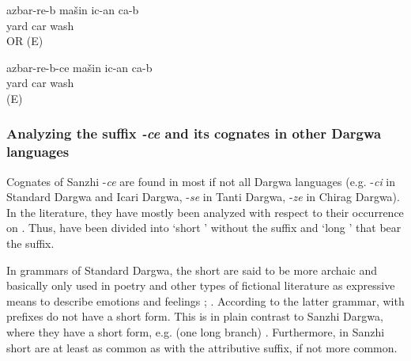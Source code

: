 \begin{exe}
	\ex	\label{ex:‎‎The car has to be washed in the yard minor}
	\gll	azbar-re-b	mašin	ic-an	ca-b\\
		yard	car	wash	\\
	\glt	{} OR  (E)

	\ex	\label{ex:‎‎‎The car that is in the yard has to be washed minor}
	\gll	azbar-re-b-ce	mašin	ic-an	ca-b\\
		yard	car	wash	\\
	\glt	{} (E)
\end{exe}


\subsubsection{Analyzing the suffix \textit{-ce} and its cognates in other Dargwa languages}
\label{sssec:Analyzing the suffix -ce and its cognates in other Dargwa languages}

Cognates of Sanzhi -\textit{ce} are found in most if not all Dargwa languages (e.g. -\textit{ci} in Standard Dargwa and Icari Dargwa, -\textit{se} in Tanti Dargwa, -\textit{ze} in Chirag Dargwa). In the literature, they have mostly been analyzed with respect to their occurrence on . Thus,  have been divided into `short ' without the suffix and `long ' that bear the suffix.

In grammars of Standard Dargwa, the short  are said to be more archaic and basically only used in poetry and other types of fictional literature as expressive means to describe emotions and feelings \citep[26]{vandenBerg2001}; \citep[207]{AbdullaevEtAl2014}. According to the latter grammar,  with  prefixes do not have a short form. This is in plain contrast to Sanzhi Dargwa, where they have a short form, e.g.  (one long branch) . Furthermore, in Sanzhi short  are at least as common as  with the attributive suffix, if not more common.

